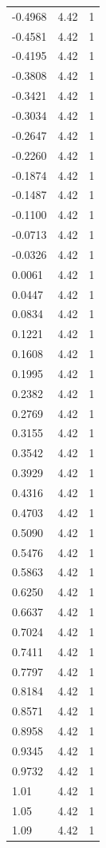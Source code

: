 \begin{longtable}{lrr}
  -0.4968 & 4.42 & 1 \\
  -0.4581 & 4.42 & 1 \\
  -0.4195 & 4.42 & 1 \\
  -0.3808 & 4.42 & 1 \\
  -0.3421 & 4.42 & 1 \\
  -0.3034 & 4.42 & 1 \\
  -0.2647 & 4.42 & 1 \\
  -0.2260 & 4.42 & 1 \\
  -0.1874 & 4.42 & 1 \\
  -0.1487 & 4.42 & 1 \\
  -0.1100 & 4.42 & 1 \\
  -0.0713 & 4.42 & 1 \\
  -0.0326 & 4.42 & 1 \\
  0.0061 & 4.42 & 1 \\
  0.0447 & 4.42 & 1 \\
  0.0834 & 4.42 & 1 \\
  0.1221 & 4.42 & 1 \\
  0.1608 & 4.42 & 1 \\
  0.1995 & 4.42 & 1 \\
  0.2382 & 4.42 & 1 \\
  0.2769 & 4.42 & 1 \\
  0.3155 & 4.42 & 1 \\
  0.3542 & 4.42 & 1 \\
  0.3929 & 4.42 & 1 \\
  0.4316 & 4.42 & 1 \\
  0.4703 & 4.42 & 1 \\
  0.5090 & 4.42 & 1 \\
  0.5476 & 4.42 & 1 \\
  0.5863 & 4.42 & 1 \\
  0.6250 & 4.42 & 1 \\
  0.6637 & 4.42 & 1 \\
  0.7024 & 4.42 & 1 \\
  0.7411 & 4.42 & 1 \\
  0.7797 & 4.42 & 1 \\
  0.8184 & 4.42 & 1 \\
  0.8571 & 4.42 & 1 \\
  0.8958 & 4.42 & 1 \\
  0.9345 & 4.42 & 1 \\
  0.9732 & 4.42 & 1 \\
  1.01 & 4.42 & 1 \\
  1.05 & 4.42 & 1 \\
  1.09 & 4.42 & 1 \\

\end{longtable}
